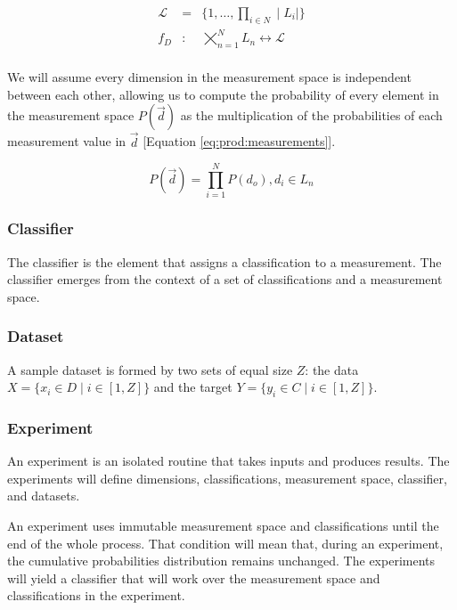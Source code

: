 \documentclass[letterpaper, conference]{IEEEtran}
\begin{document}
\begin{equation}\label{eq:linear-address}
  \begin{aligned}
  \mathcal{L} &=& \{1, \dots, \prod_{i \in N} \mid L_i \mid\} \\
  f_D&:& \bigtimes_{n=1}^{N} L_n \longleftrightarrow \mathcal{L} \\
  \end{aligned}
\end{equation}

We will assume every dimension in the measurement space is independent between each other, allowing us to compute the probability of every element in the measurement space $P(\vec{d})$ as the multiplication of the probabilities of each measurement value in $\vec{d}$ [Equation \ref{eq:prod:measurements}].

\begin{equation}\label{eq:prod:measurements}
  P(\vec{d}) = \prod_{i = 1}^{N} P(d_o), d_i \in L_n
\end{equation}

\subsubsection{Classifier}
The classifier is the element that assigns a classification to a measurement. The classifier emerges from the context of a set of classifications and a measurement space.

\subsubsection{Dataset}
A sample dataset is formed by two sets of equal size $Z$: the data $ X = \{x_i \in D \mid i \in [1, Z]\}$ and the target $Y = \{ y_i \in C \mid i \in [1, Z]\}$.

\subsubsection{Experiment}
An experiment is an isolated routine that takes inputs and produces results. The experiments will define dimensions, classifications, measurement space, classifier, and datasets.

An experiment uses immutable measurement space and classifications until the end of the whole process. That condition will mean that, during an experiment, the cumulative probabilities distribution remains unchanged. The experiments will yield a classifier that will work over the measurement space and classifications in the experiment.
\end{document}
